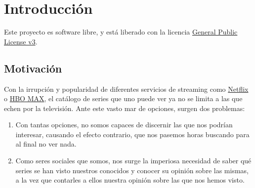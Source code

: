 \chapter{Introducción}

Este proyecto es software libre, y está liberado con la licencia \href{http://www.gnu.org/licenses/gpl.html}{General Public License v3}\cite{gplv3}.

\section{Motivación}
Con la irrupción y popularidad de diferentes servicios de streaming como \href{https://netflix.com}{Netflix} o \href{https://hbomax.com}{HBO MAX}, el catálogo de series que uno puede ver ya no se limita a las que echen por la televisión. Ante este vasto mar de opciones, surgen dos problemas:
\begin{enumerate}
    \item Con tantas opciones, no somos capaces de discernir las que nos podrían interesar, causando el efecto contrario, que nos pasemos horas buscando para al final no ver nada.
    \item Como seres sociales que somos, nos surge la imperiosa necesidad de saber qué series se han visto nuestros conocidos y conocer su opinión sobre las mismas, a la vez que contarles a ellos nuestra opinión sobre las que nos hemos visto.
\end{enumerate}

